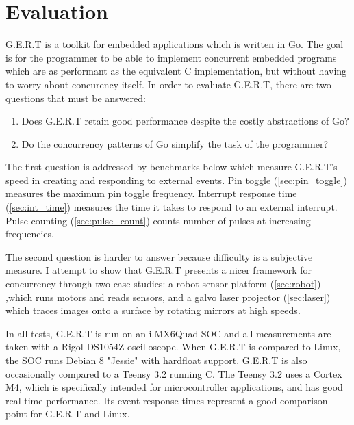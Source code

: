 \chapter{Evaluation}

G.E.R.T is a toolkit for embedded applications which is written in Go.
The goal is for the programmer to be able to implement concurrent embedded programs
which are as performant as the equivalent C implementation, but without having to
worry about concurency itself. In order to evaluate G.E.R.T, there are two questions that must be answered:

\begin{enumerate}
  \item Does G.E.R.T retain good performance despite the costly abstractions of Go?
  \item Do the concurrency patterns of Go simplify the task of the programmer?
\end{enumerate}

The first question is addressed by benchmarks below which measure G.E.R.T's
speed in creating and responding to external events. Pin toggle (\ref{sec:pin_toggle})
measures the maximum pin toggle frequency. Interrupt response time (\ref{sec:int_time})
measures the time it takes to respond to an external interrupt. Pulse counting
(\ref{sec:pulse_count}) counts number of pulses at increasing frequencies.

The second question is harder to answer because difficulty is a subjective
measure. I attempt to show that G.E.R.T presents a nicer framework for
concurrency through two case studies: a robot sensor platform (\ref{sec:robot})
,which runs motors and reads sensors, and a galvo laser projector (\ref{sec:laser})
which traces images onto a surface by rotating mirrors at high speeds.

In all tests, G.E.R.T is run on an i.MX6Quad SOC and all measurements are taken
with a Rigol DS1054Z oscilloscope. When G.E.R.T is compared to Linux, the SOC
runs Debian 8 "Jessie" with hardfloat support. G.E.R.T is also occasionally
compared to a Teensy 3.2 running C. The Teensy 3.2 uses a Cortex M4, which is specifically
intended for microcontroller applications, and has good real-time performance. Its event
response times represent a good comparison point for G.E.R.T and Linux.


